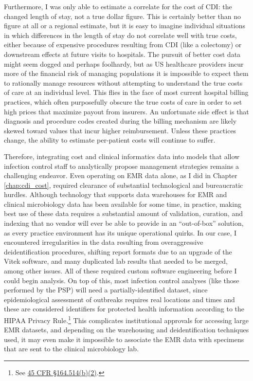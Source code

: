 Furthermore, I was only able to estimate a correlate for the cost of CDI: the changed length of stay, not a true dollar figure. This is certainly better than no figure at all or a regional estimate, but it is easy to imagine individual situations in which differences in the length of stay do not correlate well with true costs, either because of expensive procedures resulting from CDI (like a colectomy) or downstream effects at future visits to hospitals. The pursuit of better cost data might seem dogged and perhaps foolhardy, but as US healthcare providers incur more of the financial risk of managing populations\autocite{Shortell2015} it is impossible to expect them to rationally manage resources without attempting to understand the true costs of care at an individual level.\autocite{Hilsenrath2015} This flies in the face of most current hospital billing practices, which often purposefully obscure the true costs of care in order to set high prices that maximize payout from insurers.\autocite{Hilsenrath2015} An unfortunate side effect is that diagnosis and procedure codes created during the billing mechanism are likely skewed toward values that incur higher reimbursement.\autocite{Rhee2015,Romano1994} Unless these practices change, the ability to estimate per-patient costs will continue to suffer.

Therefore, integrating cost and clinical informatics data into models that allow infection control staff to analytically propose management strategies remains a challenging endeavor. Even operating on EMR data alone, as I did in Chapter \ref{chap:cdi_cost}, required clearance of substantial technological and bureaucratic hurdles. Although technology that supports data warehouses for EMR and clinical microbiology data has been available for some time,\autocite{Isniewski2003} in practice, making best use of these data requires a substantial amount of validation, curation, and indexing that no vendor will ever be able to provide in an ``out-of-box'' solution, as every practice environment has its unique operational quirks. In our case, I encountered irregularities in the data resulting from overaggressive deidentification procedures, shifting report formats due to an upgrade of the Vitek software, and many duplicated lab results that needed to be merged, among other issues. All of these required custom software engineering before I could begin analysis. On top of this, most infection control analyses (like those performed by the PSP) will need a partially-identified dataset, since epidemiological assessment of outbreaks requires real locations and times and these are considered identifiers for protected health information according to the HIPAA Privacy Rule.\footnote{See \href{https://www.law.cornell.edu/cfr/text/45/164.514}{45 CFR §164.514(b)(2)}.} This complicates institutional approvals for accessing large EMR datasets, and depending on the warehousing and deidentification techniques used, it may even make it impossible to associate the EMR data with specimens that are sent to the clinical microbiology lab.

